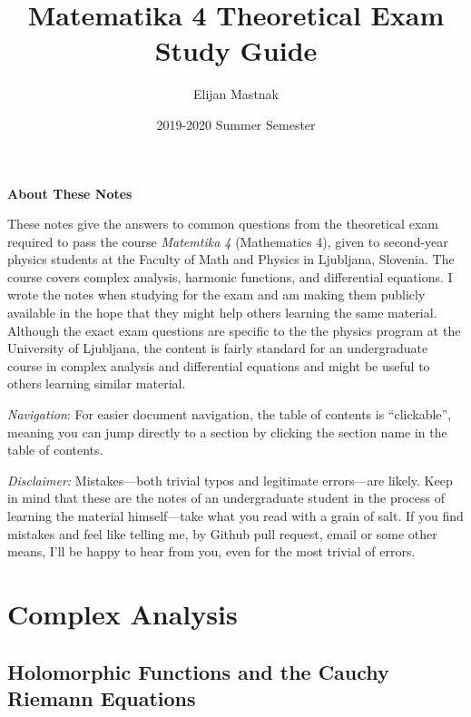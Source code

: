 \documentclass[11pt, a4paper]{article}
\begin{document}
\title{Matematika 4 Theoretical Exam Study Guide}
\author{Elijan Mastnak}
\date{2019-2020 Summer Semester}
\maketitle

\begin{center}
\textbf{About These Notes}
\end{center}
These notes give the answers to common questions from the theoretical exam required to pass the course \textit{Matemtika 4} (Mathematics 4), given to second-year physics students at the Faculty of Math and Physics in Ljubljana, Slovenia. The course covers complex analysis, harmonic functions, and differential equations. I wrote the notes when studying for the exam and am making them publicly available in the hope that they might help others learning the same material. Although the exact exam questions are specific to the the physics program at the University of Ljubljana, the content is fairly standard for an undergraduate course in complex analysis and differential equations and might be useful to others learning similar material.

\vspace{2mm}
\textit{Navigation}: For easier document navigation, the table of contents is ``clickable'', meaning you can jump directly to a section by clicking the section name in the table of contents.

\vspace{2mm}
\textit{Disclaimer:} Mistakes---both trivial typos and legitimate errors---are likely. Keep in mind that these are the notes of an undergraduate student in the process of learning the material himself---take what you read with a grain of salt. If you find mistakes and feel like telling me, by Github pull request, email or some other means, I'll be happy to hear from you, even for the most trivial of errors.


\tableofcontents

\newpage
\section{Complex Analysis}

\subsection{Holomorphic Functions and the Cauchy Riemann Equations}
\end{document}
